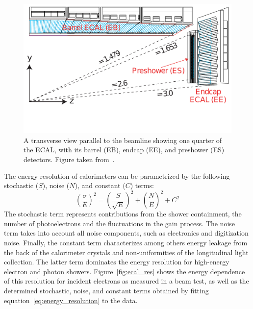\begin{figure}[ht]
 \centering
 \includegraphics[width = .8\textwidth]{Transverse_section}
\caption{A transverse view parallel to the beamline showing one quarter of the \ac{ECAL}, with its barrel (EB), endcap (EE), and preshower (ES) detectors. Figure taken from~\cite{Bayatian:2006nff}.}
\label{fig:ecal}
\end{figure}

The energy resolution of calorimeters can be parametrized by the following stochastic ($S$), noise ($N$), and constant ($C$) terms:
\begin{equation}
\label{eq:energy_resolution}
 \left(\frac{\sigma}{E}\right)^2 = \left(\frac{S}{\sqrt{E}}\right)^2 + \left(\frac{N}E{}\right)^2 + C^2
\end{equation}
The stochastic term represents contributions from the shower containment, the number of photoelectrons and the fluctuations in the gain process.  The noise term takes into account all noise components, such as electronics and digitization noise. Finally, the constant term characterizes among others energy leakage from the back of the calorimeter crystals and non-uniformities of the longitudinal light collection. The latter term dominates the energy resolution for high-energy electron and photon showers. Figure~\ref{fig:ecal_res} shows the energy dependence of this resolution for incident electrons as measured in a beam test, as well as the determined stochastic, noise, and constant terms obtained by fitting  equation~\ref{eq:energy_resolution} to the data.

